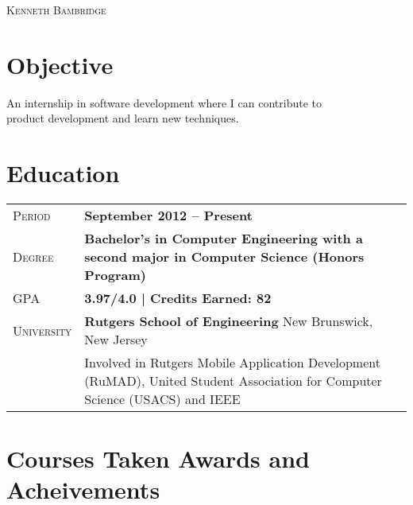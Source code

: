 \documentclass[a4paper, oneside, final]{scrartcl} %
\newcommand{\gray}{\rowcolor[gray]{.90}} %
\begin{document}
\begin{center} %


{\fontsize{27}{25}\selectfont\scshape Kenneth Bambridge} %

\vspace{0.6cm} %


\section{Objective}

An internship in software development where I can contribute to \\ product development and learn new techniques.


\section{Education}

\begin{tabularx}{0.97\linewidth}{>{\raggedleft\scshape}p{2cm}X}
\gray Period & \textbf{September 2012 -- Present}\\
    \gray Degree & \textbf{Bachelor's in Computer Engineering with a second major in Computer Science (Honors Program) }\\
\gray GPA & \textbf{3.97/4.0 | Credits Earned: 82}\\
\gray University & \textbf{Rutgers School of Engineering} \hfill New Brunswick, New Jersey\\
 & Involved in Rutgers Mobile Application Development (RuMAD), United Student Association for
Computer Science (USACS) and IEEE
\end{tabularx}

\section{Courses Taken \hspace{2.0cm}  Awards and Acheivements}


\end{center}
\end{document}
